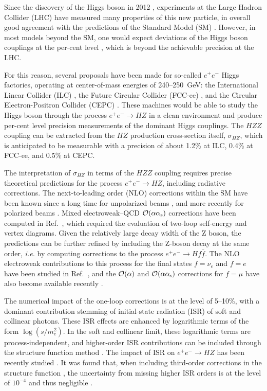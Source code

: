 \documentclass[12pt]{article}
\makeatletter
\newcommand{\as}{\alpha_{\mathrm s}}
\def\section{\@startsection {section}{1}{\z@}{-3.5ex plus -1ex minus 
 -.2ex}{2.3ex plus .2ex}{\large\bf\boldmath}}
\makeatother
\begin{document}
\section{Introduction}

Since the discovery of the Higgs boson in 2012 \cite{higgs1}, experiments at the
Large Hadron Collider (LHC) have measured many properties of this new particle,
in overall good agreement with the predictions of the Standard Model (SM)
\cite{rpp}. However, in most models beyond the SM, one would expect deviations
of the Higgs boson couplings at the per-cent level \cite{Englert:2014uua}, which is
beyond the achievable precision at the LHC.

For this reason, several proposals have been made for so-called $e^+e^-$ Higgs
factories, operating at center-of-mass energies of 240--250~GeV: the International
Linear Collider (ILC) \cite{ilc}, the Future Circular Collider (FCC-ee)
\cite{fccee}, and the Circular Electron-Positron Collider (CEPC) \cite{cepc}.
These machines would be able to study the Higgs boson through the process
$e^+e^- \to HZ$ in a clean environment and produce per-cent level precision
measurements of the dominant Higgs couplings. The $HZZ$ coupling can be
extracted from the $HZ$ production cross-section itself, $\sigma_{HZ}$, which is
anticipated to be measurable with a precision of about 1.2\% at ILC, 0.4\% at
FCC-ee, and 0.5\% at CEPC.

The interpretation of $\sigma_{HZ}$ in terms of the $HZZ$ coupling requires
precise theoretical predictions for the process $e^+e^- \to HZ$, including
radiative corrections. The next-to-leading order (NLO) corrections within the SM
have been known since a long time for unpolarized beams \cite{nlo}, and more
recently for polarized beams \cite{Bondarenko:2018sgg}. Mixed electroweak--QCD
${\cal O}(\alpha\as)$ corrections have been computed in Ref.~\cite{ewqcd},
which required the evaluation of two-loop self-energy and vertex diagrams. Given
the relatively large decay width of the Z boson, the predictions can be further
refined by including the Z-boson decay at the same order, \emph{i.e.} by
computing corrections to the process $e^+e^- \to Hf\bar{f}$. The NLO electroweak
contributions to this process for the final states $f=\nu_e$ and $f=e$ have been
studied in Ref.~\cite{nlo2}, and the ${\cal O}(\alpha)$ and ${\cal O}(\alpha\as)$ corrections for
$f=\mu$ have also become available recently \cite{ewqcd2}.

The numerical impact of the one-loop corrections is at the level of 5--10\%,
with a dominant contribution stemming of initial-state radiation (ISR) of soft
and collinear photons. These ISR effects are enhanced by logarithmic terms of the form
$\log(s/m_e^2)$. In the soft and collinear limit, these logarithmic terms are
process-independent, and higher-order ISR contributions can be included through
the structure function method \cite{strfunc}. The impact of ISR on $e^+e^- \to
HZ$ has been recently studied \cite{isrhv,isrhv2}. It was found that, when
including third-order corrections in the structure function \cite{strfunc3}, the
uncertainty from missing higher ISR orders is at the level of $10^{-4}$ and thus
negligible \cite{isrhv2}.
\end{document}
